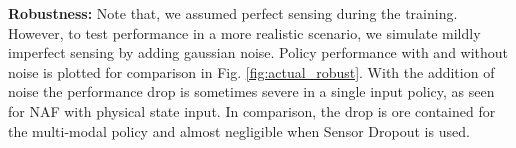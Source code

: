 \documentclass[../thesis.tex]{subfiles}
\begin{document}
\textbf{Robustness:} Note that, we assumed perfect sensing during the training. However, to test performance in a more realistic scenario, we simulate mildly imperfect sensing by adding gaussian noise. Policy performance with and without noise is plotted for comparison in Fig. \ref{fig:actual_robust}.
With the addition of noise the performance drop is sometimes severe in a single input policy, as seen for NAF with physical state input. In comparison, the drop is ore contained for the multi-modal policy and almost negligible when Sensor Dropout is used.


\end{document}
